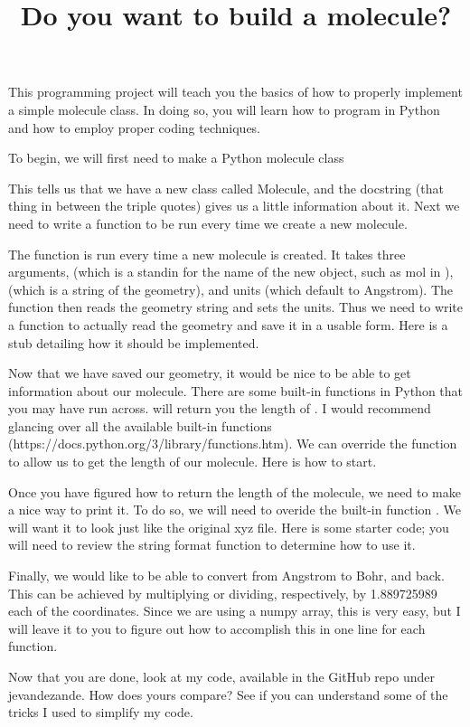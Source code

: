 \documentclass[11pt]{article}
\title{Do you want to build a molecule?}
\date{}
\begin{document}
\maketitle

This programming project will teach you the basics of how to properly implement
a simple molecule class. In doing so, you will learn how to program in Python
and how to employ proper coding techniques.

To begin, we will first need to make a Python molecule class


This tells us that we have a new class called Molecule, and the docstring (that
thing in between the triple quotes) gives us a little information about it. Next
we need to write a function to be run every time we create a new molecule.


The function  is run every time a new molecule is created.
It takes three arguments,  (which is a standin for the name of
the new object, such as mol in ),
 (which is a string of the geometry), and units (which
default to Angstrom). The function then reads the geometry string and sets the
units. Thus we need to write a function to actually read the geometry and save
it in a usable form. Here is a stub detailing how it should be implemented.


Now that we have saved our geometry, it would be nice to be able to get
information about our molecule. There are some built-in functions in Python
that you may have run across.  will return you the
length of . I would recommend glancing over all the
available built-in functions (https://docs.python.org/3/library/functions.htm).
We can override the function  to allow us to get the length
of our molecule. Here is how to start.


Once you have figured how to return the length of the molecule, we need to make
a nice way to print it. To do so, we will need to overide the built-in function
. We will want it to look just like the original xyz file. Here is some
starter code; you will need to review the string format function to determine
how to use it.


Finally, we would like to be able to convert from Angstrom to Bohr, and back.
This can be achieved by multiplying or dividing, respectively, by 1.889725989
each of the coordinates. Since we are using a numpy array, this is very easy,
but I will leave it to you to figure out how to accomplish this in one line
for each function.

Now that you are done, look at my code, available in the GitHub repo under
jevandezande. How does yours compare? See if you can understand some of the
tricks I used to simplify my code.
\end{document}
